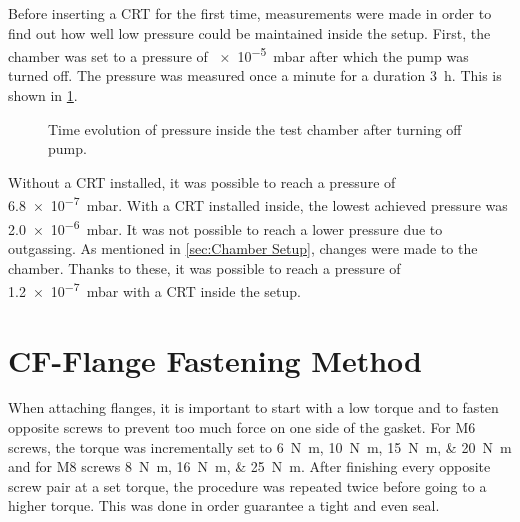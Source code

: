 Before inserting a CRT for the first time, measurements were made in order to find out how well low pressure could be maintained inside the setup. First, the chamber was set to a pressure of \SI{e-5}{\milli\bar} after which the pump was turned off. The pressure was measured once a minute for a duration \SI{3}{\hour}. This is shown in \cref{fig:Time evolution of pressure inside the test chamber after turning off pump}.

\begin{figure}[ht]
	\centering
		
	\begin{tikzpicture}
		
	\end{tikzpicture}
	
	\caption{Time evolution of pressure inside the test chamber after turning off pump.}
	\label{fig:Time evolution of pressure inside the test chamber after turning off pump}
\end{figure}

Without a CRT installed, it was possible to reach a pressure of \SI{6.8e-7}{\milli\bar}. With a CRT installed inside, the lowest achieved pressure was \SI{2.0e-6}{\milli\bar}. It was not possible to reach a lower pressure due to outgassing. As mentioned in \cref{sec:Chamber Setup}, changes were made to the chamber. Thanks to these, it was possible to reach a pressure of \SI{1.2e-7}{\milli\bar} with a CRT inside the setup.

\section{CF-Flange Fastening Method}
\label{sec:CF-Flange fastening method}

When attaching flanges, it is important to start with a low torque and to fasten opposite screws to prevent too much force on one side of the gasket. For M6 screws, the torque was incrementally set to \SIlist{6;10;15;20}{\newton\meter} and for M8 screws \SIlist{8;16;25}{\newton\meter}. After finishing every opposite screw pair at a set torque, the procedure was repeated twice before going to a higher torque. This was done in order guarantee a tight and even seal.